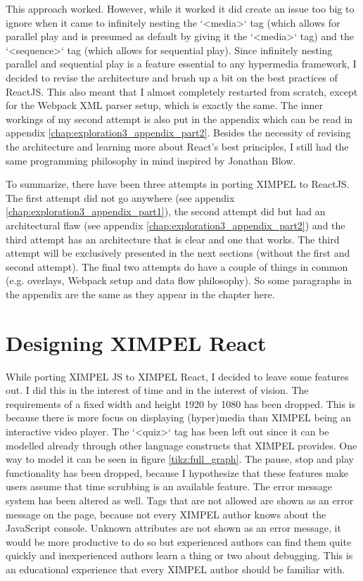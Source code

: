 This approach worked. However, while it worked it did create an issue too big to ignore when it came to infinitely nesting the `<media>` tag (which allows for parallel play and is presumed as default by giving it the `<media>` tag) and the `<sequence>` tag (which allows for sequential play). Since infinitely nesting parallel and sequential play is a feature essential to any hypermedia framework, I decided to revise the architecture and brush up a bit on the best practices of ReactJS. This also meant that I almost completely restarted from scratch, except for the Webpack XML parser setup, which is exactly the same. The inner workings of my second attempt is also put in the appendix which can be read in appendix \ref{chap:exploration3_appendix_part2}. Besides the necessity of revising the architecture and learning more about React's best principles, I still had the same programming philosophy in mind inspired by Jonathan Blow.

To summarize, there have been three attempts in porting XIMPEL to ReactJS. The first attempt did not go anywhere (see appendix \ref{chap:exploration3_appendix_part1}), the second attempt did but had an architectural flaw (see appendix \ref{chap:exploration3_appendix_part2}) and the third attempt has an architecture that is clear and one that works. The third attempt will be exclusively presented in the next sections  (without the first and second attempt). The final two attempts do have a couple of things in common (e.g. overlays, Webpack setup and data flow philosophy). So some paragraphs in the appendix are the same as they appear in the chapter here.

\section{Designing XIMPEL React}
While porting XIMPEL JS to XIMPEL React, I decided to leave some features out. I did this in the interest of time and in the interest of vision. The requirements of a fixed width and height 1920 by 1080 has been dropped. This is because there is more focus on displaying (hyper)media than XIMPEL being an interactive video player. The `<quiz>` tag has been left out since it can be modelled already through other language constructs that XIMPEL provides. One way to model it can be seen in figure \ref{tikz:full_graph}. The pause, stop and play functionality has been dropped, because I hypothesize that these features make users assume that time scrubbing is an available feature. The error message system has been altered as well. Tags that are not allowed are shown as an error message on the page, because not every XIMPEL author knows about the JavaScript console. Unknown attributes are not shown as an error message, it would be more productive to do so but experienced authors can find them quite quickly and inexperienced authors learn a thing or two about debugging. This is an educational experience that every XIMPEL author should be familiar with.

